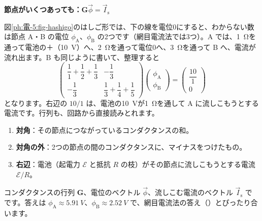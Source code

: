 \noindent\textbf{節点がいくつあっても：$\mathbf G\vec\phi=\vec I_{\mathrm s}$}\par\nobreak
図\ref{ph:電-5:fig-hashigo}のはしご形では、下の線を電位0にすると、わからない数は節点 A・B の電位 $\phi_{\mathrm A}$、$\phi_{\mathrm B}$ の2つです（網目電流法では3つ）。A では、\qty{1}{\ohm}を通って電池の＋（\qty{10}{V}）へ、\qty{2}{\ohm}を通って電位0へ、\qty{3}{\ohm}を通って B へ、電流が流れ出ます。B も同じように書いて、整理すると
\[ \begin{pmatrix}\dfrac11+\dfrac12+\dfrac13&-\dfrac13\\[8pt]-\dfrac13&\dfrac13+\dfrac14+\dfrac15\end{pmatrix}\begin{pmatrix}\phi_{\mathrm A}\\[8pt] \phi_{\mathrm B}\end{pmatrix}=\begin{pmatrix}\dfrac{10}{1}\\[8pt]0\end{pmatrix} \]
となります。右辺の $10/1$ は、電池の\qty{10}{V}が\qty{1}{\ohm}を通して A に流しこもうとする電流です。行列も、回路から直接読みとれます。
\begin{enumerate}[label={\bkcircled{\arabic*}}, leftmargin=2.4\zw, itemsep=2pt, topsep=2pt]
\item \textbf{対角}：その節点につながっているコンダクタンスの和。
\item \textbf{対角の外}：2つの節点の間のコンダクタンスに、マイナスをつけたもの。
\item \textbf{右辺}：電池（起電力 $\mathcal E$ と抵抗 $R$ の枝）がその節点に流しこもうとする電流 $\mathcal E/R$。
\end{enumerate}
コンダクタンスの行列 $\mathbf G$、電位のベクトル $\vec\phi$、流しこむ電流のベクトル $\vec I_{\mathrm s}$ で
\label{ph:電-5:node}です。答えは $\phi_{\mathrm A}\approx\qty{5.91}{V}$、$\phi_{\mathrm B}\approx\qty{2.52}{V}$ で、網目電流法の答え（）とぴったり合います。


